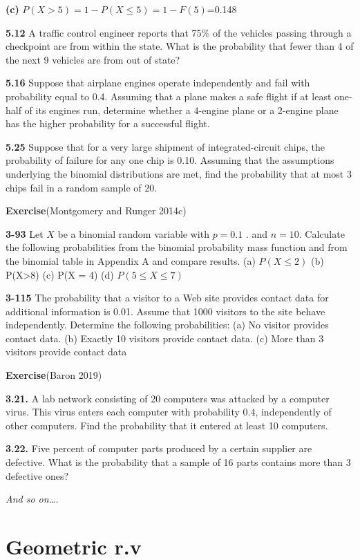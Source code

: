 \documentclass[
  11pt,
  letterpaper,
  DIV=11,
  numbers=noendperiod]{scrreprt}
\begin{document}
\textbf{(c)} \(P(X > 5)=1-P(X \le 5)=1-F(5)\)=0.148

\textbf{5.12} A traffic control engineer reports that 75\% of the
vehicles passing through a checkpoint are from within the state. What is
the probability that fewer than 4 of the next 9 vehicles are from out of
state?

\textbf{5.16} Suppose that airplane engines operate independently and
fail with probability equal to 0.4. Assuming that a plane makes a safe
flight if at least one-half of its engines run, determine whether a
4-engine plane or a 2-engine plane has the higher probability for a
successful flight.

\textbf{5.25} Suppose that for a very large shipment of
integrated-circuit chips, the probability of failure for any one chip is
0.10. Assuming that the assumptions underlying the binomial
distributions are met, find the probability that at most 3 chips fail in
a random sample of 20.

\textbf{Exercise}(Montgomery and Runger 2014c)

\textbf{3-93} Let \(X\) be a binomial random variable with \(p = 0.1\) .
and \(n = 10\). Calculate the following probabilities from the binomial
probability mass function and from the binomial table in Appendix A and
compare results. (a) \(P(X\le 2)\) (b) P(X\textgreater8) (c) P(X = 4)
(d) \(P(5 \le X \le7)\)

\textbf{3-115} The probability that a visitor to a Web site provides
contact data for additional information is 0.01. Assume that 1000
visitors to the site behave independently. Determine the following
probabilities: (a) No visitor provides contact data. (b) Exactly 10
visitors provide contact data. (c) More than 3 visitors provide contact
data

\textbf{Exercise}(Baron 2019)

\textbf{3.21.} A lab network consisting of 20 computers was attacked by
a computer virus. This virus enters each computer with probability 0.4,
independently of other computers. Find the probability that it entered
at least 10 computers.

\textbf{3.22.} Five percent of computer parts produced by a certain
supplier are defective. What is the probability that a sample of 16
parts contains more than 3 defective ones?

\emph{And so on\ldots.}

\section{Geometric r.v}\label{geometric-r.v}
\end{document}
